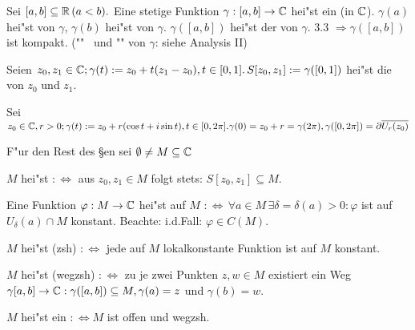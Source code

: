 \documentclass[a4paper,twoside,DIV15,BCOR12mm]{scrbook}
\begin{document}
\begin{definition}
Sei $[a,b] \subseteq \mathbb{R} \, (a < b).$ Eine stetige Funktion $\gamma: [a,b] \rightarrow \mathbb{C}$ hei"st ein  (in $\mathbb{C}$). $\gamma(a)$ hei"st  von $\gamma$, $\gamma(b)$ hei"st  von $\gamma$. $\gamma([a,b])$ hei"st der  von $\gamma$. 3.3 $\Rightarrow \gamma([a,b])$ ist kompakt. ("" \, und "" von $\gamma$: siehe Analysis II)
\end{definition}

\begin{beispiele}
\item Seien $z_0, z_1 \in \mathbb{C}; \gamma(t) := z_0 + t(z_1-z_0), t \in [0,1]. \, S[z_0,z_1] := \gamma([0,1])$ hei"st die  von $z_0$ und $z_1$.
\item Sei $z_0 \in \mathbb{C}, r>0; \gamma(t) := z_0 + r(\cos t + i \sin t), t \in [0,2\pi]. \gamma(0) = z_0 + r = \gamma(2\pi), \gamma([0,2\pi]) = \partial \overline{U_r(z_0)}$
\end{beispiele}

F"ur den Rest des §en sei $\emptyset \not= M \subseteq \mathbb{C}$

\begin{definition}
$M$ hei"st  $:\Leftrightarrow$ aus $z_0, z_1 \in M$ folgt stets: $S[z_0,z_1] \subseteq M.$
\end{definition}

\begin{definition}
\begin{liste}
\item Eine Funktion $\varphi: M \rightarrow \mathbb{C}$ hei"st auf $M$  $:\Leftrightarrow \, \forall a \in M \, \exists \delta = \delta(a) > 0: \varphi$ ist auf $U_{\delta}(a) \cap M$ konstant. Beachte: i.d.Fall: $\varphi \in C(M)$.
\item $M$ hei"st  (zsh) $:\Leftrightarrow$ jede auf $M$ lokalkonstante Funktion ist auf $M$ konstant.
\item $M$ hei"st  (wegzsh) $:\Leftrightarrow$ zu je zwei Punkten $z,w \in M$ existiert ein Weg $\gamma[a,b] \rightarrow \mathbb{C}: \gamma([a,b]) \subseteq M, \gamma(a)=z$ und $\gamma(b)=w$.
\item $M$ hei"st ein  $:\Leftrightarrow M$ ist offen und wegzsh.
\end{liste}
\end{definition}
\end{document}
